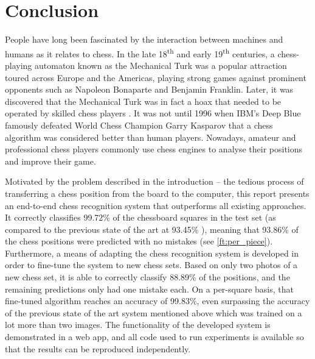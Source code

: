 \documentclass[../main.tex]{subfiles}
\begin{document}
\chapter{Conclusion}
\label{chap:conclusion}

People have long been fascinated by the interaction between machines and humans as it relates to chess.
In the late 18\textsuperscript{th} and early 19\textsuperscript{th} centuries, a chess-playing automaton known as the Mechanical Turk was a popular attraction toured across Europe and the Americas, playing strong games against prominent opponents such as Napoleon Bonaparte and Benjamin Franklin.
Later, it was discovered that the Mechanical Turk was in fact a hoax that needed to be operated by skilled chess players \cite{standage2003}.
It was not until 1996 when IBM's Deep Blue famously defeated World Chess Champion Garry Kasparov that a chess algorithm was considered better than human players.
Nowadays, amateur and professional chess players commonly use chess engines to analyse their positions and improve their game.

Motivated by the problem described in the introduction -- the tedious process of transferring a chess position from the board to the computer, this report presents an end-to-end chess recognition system that outperforms all existing approaches.
It correctly classifies 99.72\% of the chessboard squares in the test set (as compared to the previous state of the art at 93.45\% \cite{mehta2020}), meaning that 93.86\% of the chess positions were predicted with no mistakes (see \cref{ft:per_piece}). 
Furthermore, a means of adapting the chess recognition system is developed in order to fine-tune the system to new chess sets.
Based on only two photos of a new chess set, it is able to correctly classify 88.89\% of the positions, and the remaining predictions only had one mistake each.
On a per-square basis, that fine-tuned algorithm reaches an accuracy of 99.83\%, even surpassing the accuracy of the previous state of the art system mentioned above which was trained on a lot more than two images.
The functionality of the developed system is demonstrated in a web app, and all code used to run experiments is available so that the results can be reproduced independently.
\end{document}

